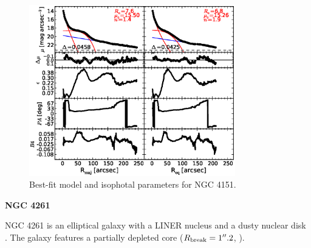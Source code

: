 \documentclass[preprint2]{emulateapj}
\newcommand{\fitfigurewidth}{0.8\textwidth}
\begin{document}
  \begin{figure}[h]
  \begin{center}
  \includegraphics[width=\fitfigurewidth]{images/n4151_1Dfit.eps}
  \caption{Best-fit model and isophotal parameters for NGC 4151.}
  \end{center}
  \end{figure}




  \clearpage\newpage\noindent
  {\bf NGC 4261 \\}

  NGC 4261 is an elliptical galaxy with %
  a LINER nucleus \citep{veroncettyveron2006}
  and a dusty nuclear disk \citep{tran2001}.
  The galaxy features a partially depleted core ($R_{\rm break} = 1''.2$, \citealt{rusli2013}).

\end{document}
